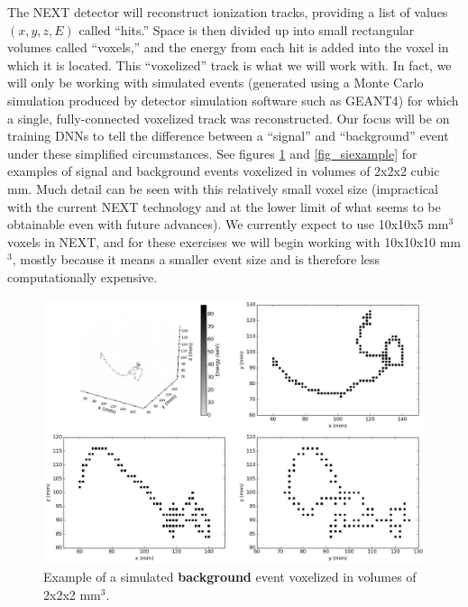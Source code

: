 \documentclass[10pt]{article}
\begin{document}
\noindent The NEXT detector will reconstruct ionization tracks, providing a list of values $(x,y,z,E)$ called ``hits.''  Space is then divided up into small rectangular volumes called ``voxels,'' and
the energy from each hit is added into the voxel in which it is located.  This ``voxelized'' track is what we will work with.  In fact, we will only be working with simulated events (generated using
a Monte Carlo simulation produced by detector simulation software such as GEANT4\cite{GEANT4}) for which a single,
fully-connected voxelized track was reconstructed.  Our focus will be on training DNNs to tell the difference between a ``signal'' and ``background'' event under these simplified circumstances.  See figures \ref{fig_bgexample} and \ref{fig_siexample} for examples 
of signal and background events voxelized in volumes of 2x2x2 cubic mm.  Much detail can be seen with this relatively small
voxel size (impractical with the current NEXT technology and at the lower limit of what seems to be obtainable even with future
advances).  We currently expect to use 10x10x5 mm$^3$ voxels in NEXT, and for these exercises we will begin working with
10x10x10 mm$^3$, mostly because it means a smaller event size and is therefore less computationally expensive.

\begin{figure}[!ht]
	\centering
	\includegraphics[scale=0.4]{fig/plt_dnn3d_NEXT100_Paolina222_v2x2x2_r200x200x200_bg_5.png}
	\caption{\label{fig_bgexample}Example of a simulated \textbf{background} event voxelized in volumes of 2x2x2 mm$^3$.}
\end{figure}
\end{document}
